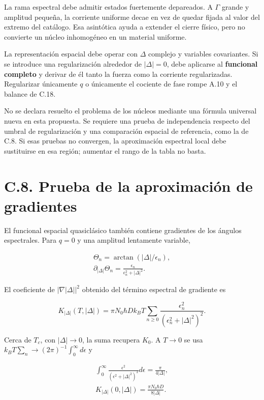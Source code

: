 \documentclass[
  spanish,
  10pt,
  a4paper,
]{article}
\begin{document}
La rama espectral debe admitir estados fuertemente depareados. A
\(\Gamma\) grande y amplitud pequeña, la corriente uniforme decae en vez
de quedar fijada al valor del extremo del catálogo. Esa asintótica ayuda
a extender el cierre físico, pero no convierte un núcleo inhomogéneo en
un material uniforme.

La representación espacial debe operar con \(\Delta\) complejo y
variables covariantes. Si se introduce una regularización alrededor de
\(|\Delta|=0\), debe aplicarse al \textbf{funcional completo} y derivar
de él tanto la fuerza como la corriente regularizadas. Regularizar
únicamente \(q\) o únicamente el cociente de fase rompe A.10 y el
balance de C.18.

No se declara resuelto el problema de los núcleos mediante una fórmula
universal nueva en esta propuesta. Se requiere una prueba de
independencia respecto del umbral de regularización y una comparación
espacial de referencia, como la de C.8. Si esas pruebas no convergen, la
aproximación espectral local debe sustituirse en esa región; aumentar el
rango de la tabla no basta.

\section{C.8. Prueba de la aproximación de
gradientes}\label{c.8.-prueba-de-la-aproximaciuxf3n-de-gradientes}

El funcional espacial quasiclásico también contiene gradientes de los
ángulos espectrales. Para \(q=0\) y una amplitud lentamente variable,

\[
\begin{gathered}
\Theta_n=\arctan(|\Delta|/\epsilon_n),\\
\partial_{|\Delta|}\Theta_n=\frac{\epsilon_n}{\epsilon_n^2+|\Delta|^2}.
\end{gathered}
\]

El coeficiente de \(|\nabla |\Delta||^2\) obtenido del término espectral
de gradiente es

\[
K_{|\Delta|}(T,|\Delta|)=\pi N_0\hbar D k_BT
\sum_{n\geq0}\frac{\epsilon_n^2}{(\epsilon_n^2+|\Delta|^2)^2}. \tag{C.27}
\]

Cerca de \(T_c\), con \(|\Delta|\to0\), la suma recupera \(K_0\). A
\(T\to0\) se usa \(k_BT\sum_n\to(2\pi)^{-1}\int_0^\infty d\epsilon\) y

\[
\begin{gathered}
\int_0^\infty\frac{\epsilon^2}{(\epsilon^2+|\Delta|^2)^2}d\epsilon
=\frac\pi{4|\Delta|},\\
K_{|\Delta|}(0,|\Delta|)=\frac{\pi N_0\hbar D}{8|\Delta|}.
\end{gathered} \tag{C.28}
\]
\end{document}
